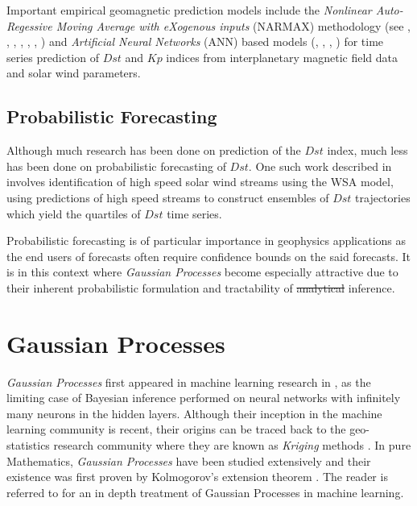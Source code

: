 \documentclass{article}
\providecommand{\DIFadd}[1]{{\protect\color{blue}\uwave{#1}}} %
\providecommand{\DIFdel}[1]{{\protect\color{red}\sout{#1}}}                      %
\providecommand{\DIFaddbegin}{} %
\providecommand{\DIFaddend}{} %
\providecommand{\DIFdelbegin}{} %
\providecommand{\DIFdelend}{} %
\newcommand{\DIFscaledelfig}{0.5}
\newlength{\DIFdelgraphicswidth} %
\newlength{\DIFdelgraphicsheight} %
\newcommand{\DIFaddincludegraphics}[2][]{{\color{blue}\fbox{\DIFOincludegraphics[#1]{#2}}}} %
\newcommand{\DIFdelincludegraphics}[2][]{%
\sbox{\DIFdelgraphicsbox}{\DIFOincludegraphics[#1]{#2}}%
\settoboxwidth{\DIFdelgraphicswidth}{\DIFdelgraphicsbox} %
\settoboxtotalheight{\DIFdelgraphicsheight}{\DIFdelgraphicsbox} %
\scalebox{\DIFscaledelfig}{%
\parbox[b]{\DIFdelgraphicswidth}{\usebox{\DIFdelgraphicsbox}\\[-\baselineskip] \rule{\DIFdelgraphicswidth}{0em}}\llap{\resizebox{\DIFdelgraphicswidth}{\DIFdelgraphicsheight}{%
\setlength{\unitlength}{\DIFdelgraphicswidth}%
\begin{picture}(1,1)%
\thicklines\linethickness{2pt} %
{\color[rgb]{1,0,0}\put(0,0){\framebox(1,1){}}}%
{\color[rgb]{1,0,0}\put(0,0){\line( 1,1){1}}}%
{\color[rgb]{1,0,0}\put(0,1){\line(1,-1){1}}}%
\end{picture}%
}\hspace*{3pt}}} %
} %
\DeclareRobustCommand{\DIFaddbegin}{\DIFOaddbegin \let\includegraphics\DIFaddincludegraphics} %
\DeclareRobustCommand{\DIFaddend}{\DIFOaddend \let\includegraphics\DIFOincludegraphics} %
\DeclareRobustCommand{\DIFdelbegin}{\DIFOdelbegin \let\includegraphics\DIFdelincludegraphics} %
\DeclareRobustCommand{\DIFdelend}{\DIFOaddend \let\includegraphics\DIFOincludegraphics} %
\begin{document}
Important empirical geomagnetic prediction models include the \emph{Nonlinear Auto-Regessive Moving Average with eXogenous inputs} (NARMAX) methodology (see \citet{doi:10.1080/00207178908559767}, \citet{GRL:GRL13494}, \citet{GRL:GRL20944}, \citet{JGRA:JGRA18657}, \citet{balikhin:narmax}, \citet{JGRA:JGRA20661}, \citet{JGRA:JGRA50192}) and \emph{Artificial Neural Networks} (ANN) based models (\citet{Lund}, \citet{JGRA:JGRA17461}, \citet{SWE:SWE286}, \citet{pallocchia:hal-00318011}) for time series prediction of $Dst$ and $Kp$ indices from interplanetary magnetic field data and solar wind parameters. 

\subsection{Probabilistic Forecasting}
Although much research has been done on prediction of the $Dst$ index, much less has been done on probabilistic forecasting of $Dst$. One such work described in \citet{McPherron:2013} involves identification of high speed solar wind streams using the WSA model, using predictions of high speed streams to construct ensembles of $Dst$ trajectories which yield the quartiles of $Dst$ time series. 

Probabilistic forecasting is of particular importance in geophysics applications as the end users of forecasts often require confidence bounds on the said forecasts. It is in this context where \emph{Gaussian Processes} become especially attractive due to their inherent probabilistic formulation and tractability of \DIFdelbegin \DIFdel{analytical }\DIFdelend \DIFaddbegin \DIFadd{exact }\DIFaddend inference.


\section{Gaussian Processes}

\emph{Gaussian Processes} first appeared in machine learning research in \citet{Neal:1996:BLN:525544}, as the limiting case of Bayesian inference performed on neural networks with infinitely many neurons in the hidden layers. Although their inception in the machine learning community is recent, their origins can be traced back to the geo-statistics research community where they are known as \emph{Kriging} methods \citep{krige1951statistical}. In pure Mathematics, \emph{Gaussian Processes} have been studied extensively and their existence was first proven by Kolmogorov's extension theorem \citep{tao2011introduction}. The reader is referred to \citet{Rasmussen:2005:GPM:1162254} for an in depth treatment of Gaussian Processes in machine learning.
\end{document}
